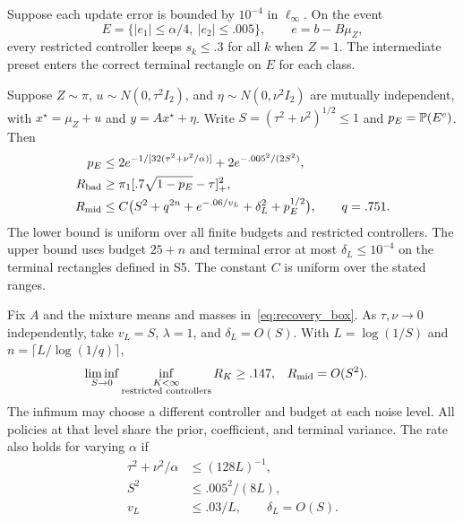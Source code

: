 \begin{theorem}\label{thm:ind_noise}
Suppose each update error is bounded by $10^{-4}$ in $\ell_\infty$.
On the event
\begin{equation}\label{eq:ind_event}
 E=\{|e_1|\le\alpha/4,\ |e_2|\le .005\},
 \qquad e=b-B\mu_Z ,
\end{equation}
every restricted controller keeps $s_k\le.3$ for all $k$ when $Z=1$.
The intermediate preset enters the correct terminal rectangle on
$E$ for each class.

Suppose $Z\sim\pi$, $u\sim N(0,\tau^2 I_2)$, and
$\eta\sim N(0,\nu^2 I_2)$ are mutually independent, with
$x^\star=\mu_Z+u$ and $y=Ax^\star+\eta$.
Write $S=(\tau^2+\nu^2)^{1/2}\le1$ and $p_E=\mathbb P(E^c)$. Then
\begin{align}
 p_E &\le
 2e^{-1/[32(\tau^2+\nu^2/\alpha)]}
 +2e^{-.005^2/(2S^2)},\label{eq:ind_tail}\\
 R_{\rm bad}&\ge
 \pi_1[.7\sqrt{1-p_E}-\tau]_+^2,\label{eq:ind_lower}\\
 R_{\rm mid}&\le C\big(S^2+q^{2n}+e^{-.06/v_L}
             +\delta_L^2+p_E^{1/2}\big),\qquad q=.751.\label{eq:ind_upper}
\end{align}
The lower bound is uniform over all finite budgets and restricted
controllers. The upper bound uses budget $25+n$ and terminal
error at most $\delta_L\le10^{-4}$ on the terminal rectangles defined in S5.
The constant $C$ is uniform over the stated ranges.
\end{theorem}

Fix $A$ and the mixture means and masses in~\eqref{eq:recovery_box}.
As $\tau,\nu\to0$ independently, take $v_L=S$, $\lambda=1$, and
$\delta_L=O(S)$. With $L=\log(1/S)$ and $n=\lceil L/\log(1/q)\rceil$,
\begin{align}\label{eq:fixed_geom}
 \liminf_{S\to0}\inf_{\substack{K<\infty\\
             \text{restricted controllers}}} R_K &\ge .147, &
 R_{\rm mid}&=O(S^2).
\end{align}
The infimum may choose a different controller and budget at each noise level.
All policies at that level share the prior, coefficient, and terminal variance.
The rate also holds for varying $\alpha$ if
\begin{align}
 \tau^2+\nu^2/\alpha &\le (128L)^{-1},\nonumber\\
 S^2 &\le .005^2/(8L),\label{eq:ind_regime}\\
 v_L &\le .03/L,\qquad \delta_L=O(S).\nonumber
\end{align}

